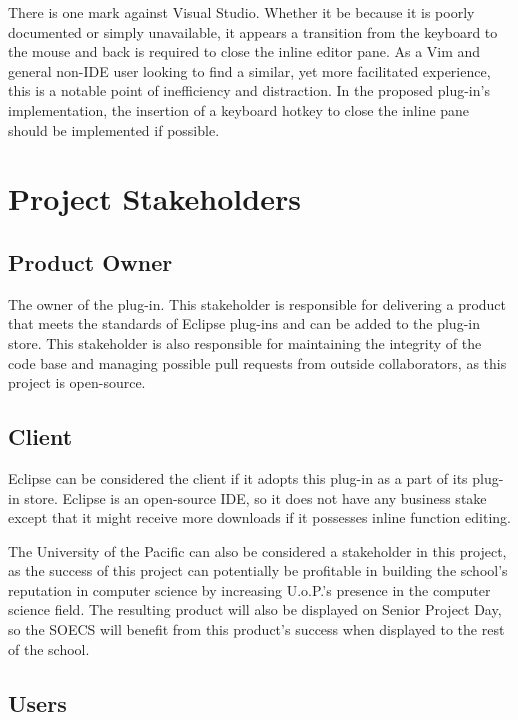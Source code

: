 \documentclass[]{report}
\begin{document}
		There is one mark against Visual Studio.  Whether it be because it is poorly documented or simply unavailable, it appears a transition from the keyboard to the mouse and back is required to close the inline editor pane.  As a Vim and general non-IDE user looking to find a similar, yet more facilitated experience, this is a notable point of inefficiency and distraction.  In the proposed plug-in's implementation, the insertion of a keyboard hotkey to close the inline pane should be implemented if possible.

\chapter{Project Stakeholders}

	\section{Product Owner}
	
		The owner of the plug-in.  This stakeholder is responsible for delivering a product that meets the standards of Eclipse plug-ins and can be added to the plug-in store.  This stakeholder is also responsible for maintaining the integrity of the code base and managing possible pull requests from outside collaborators, as this project is open-source.
	
	\section{Client}
	
		Eclipse can be considered the client if it adopts this plug-in as a part of its plug-in store.  Eclipse is an open-source IDE, so it does not have any business stake except that it might receive more downloads if it possesses inline function editing.
	
		The University of the Pacific can also be considered a stakeholder in this project, as the success of this project can potentially be profitable in building the school's reputation in computer science by increasing U.o.P.'s presence in the computer science field.  The resulting product will also be displayed on Senior Project Day, so the SOECS will benefit from this product's success when displayed to the rest of the school.
	
	\section{Users}
	
\end{document}
